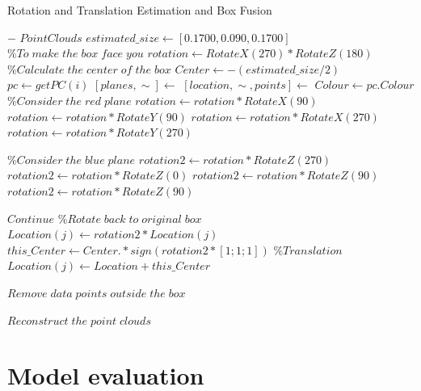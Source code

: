 \documentclass[10pt,a4paper]{article}
\begin{document}
\begin{algorithm}[!h]
	\caption{Rotation and Translation Estimation and Box Fusion}  
	\label{alg:fuse}
	\begin{algorithmic}[1]  
		\Require $-$
		\Ensure $Point Clouds$
		\State $estimated\_size \gets [0.1700,0.090,0.1700]$
		\State $\% To \;make \;the\;box \;face \;you $
		\State $rotation \gets RotateX(270) * RotateZ(180)$
		\State $\%Calculate\; the \;center\;of\;the\;box $
		\State $Center \gets - (estimated\_size / 2)$
		\State $pc \gets getPC(i)$
		\State $[planes,\sim] \gets$ 
		\State $[location, \sim, points] \gets$ 
		\State $Colour \gets pc.Colour$
		\State $\% Consider\;the\;red\;plane$
		\State $rotation \gets rotation * RotateX(90)$
		\State $rotation \gets rotation * RotateY(90)$
		\State $rotation \gets rotation * RotateX(270)$
        \State $rotation \gets rotation * RotateY(270)$
		\EndIf	
		\EndIf
		
		\State
		\State $\% Consider\;the\;blue\;plane$
		\State $rotation2 \gets rotation * RotateZ(270)$
		\State $rotation2 \gets rotation * RotateZ(0)$
        \State $rotation2 \gets rotation * RotateZ(90)$	
        \State $rotation2 \gets rotation * RotateZ(90)$			
		\EndIf
		\EndIf
		
		\State
		\State $Continue$
		\EndIf
		\State
		\State $\% Rotate \;back \;to \;original \;box$
		\State $Location(j) \gets rotation2 * Location(j)$
		\State $this\_Center \gets Center .* sign(rotation2*[1;1;1])$
		\State $\% Translation$
		\State $Location(j) \gets Location + this\_Center$
		\EndFor
		
		\State $Remove \;data \;points \;outside \;the \;box$
		
		\State $Reconstruct \;the \;point \;clouds$
		
		\EndFor 
		\EndFunction
	
	\end{algorithmic}  
\end{algorithm}  

\newpage

\section{Model evaluation}
\label{sec:evaluation}
\end{document}
